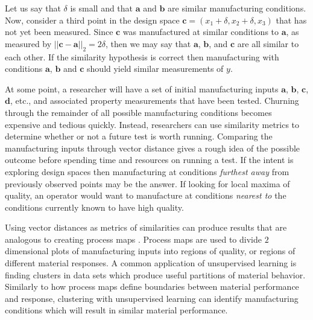 Let us say that $\delta$ is small and that $\mathbf{a}$ and $\mathbf{b}$ are similar manufacturing conditions.
Now, consider a third point in the design space $\mathbf{c} = (x_{1} + \delta, x_2 + \delta, x_3)$ that has not yet been measured.
Since $\mathbf{c}$ was manufactured at similar conditions to $\mathbf{a}$, as measured by $||\mathbf{c} - \mathbf{a}||_2 = 2\delta$, then we may say that $\mathbf{a}$, $\mathbf{b}$, and $\mathbf{c}$ are all similar to each other. If the similarity hypothesis is correct then manufacturing with conditions $\mathbf{a}$, $\mathbf{b}$ and $\mathbf{c}$ should yield similar measurements of $y$.

At some point, a researcher will have a set of initial manufacturing inputs $\mathbf{a}$, $\mathbf{b}$, $\mathbf{c}$, $\mathbf{d}$, etc., and associated property measurements that have been tested.
Churning through the remainder of all possible manufacturing conditions becomes expensive and tedious quickly.
Instead, researchers can use similarity metrics to determine whether or not a future test is worth running.
Comparing the manufacturing inputs through vector distance gives a rough idea of the possible outcome before spending time and resources on running a test.
If the intent is exploring design spaces then manufacturing at conditions \textit{furthest away} from previously observed points may be the answer.
If looking for local maxima of quality, an operator would want to manufacture at conditions \textit{nearest to} the conditions currently known to have high quality.

Using vector distances as metrics of similarities can produce results that are analogous to creating process maps \cite{Beuth2001}.
Process maps are used to divide $2$ dimensional plots of manufacturing inputs into regions of quality, or regions of different material responses. A common application of unsupervised learning is finding clusters in data sets which produce useful partitions of material behavior. Similarly to how process maps define boundaries between material performance and response, clustering with unsupervised learning can identify manufacturing conditions which will result in similar material performance.



